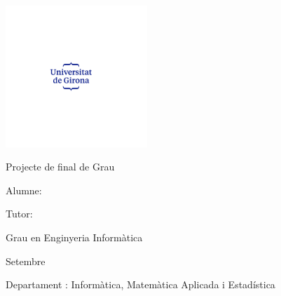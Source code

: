 
\begin{titlepage}
    \centering
    \includegraphics[width=0.4\textwidth, trim = 63mm 79mm 78mm 79mm, clip]{UdG_dues_linies_centrat_blau.pdf}\par
    \vspace{1.5cm} %
    
    \LARGE
    Projecte de final de Grau
    \vspace{1.5cm}
    
    \titol
    \vspace{2.5cm}


    
    \Large
    Alumne: \autortesi
    
    Tutor: \tutortesi

    \vspace{2cm}
    
    Grau en Enginyeria Informàtica
    
    Setembre \anydediposit
    
    \vspace{1.5cm}
    Departament : Informàtica, Matemàtica Aplicada i Estadística

    \vfill
\end{titlepage}